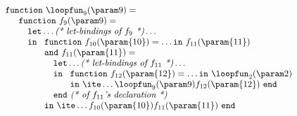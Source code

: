 \begin{equation}
\begin{array}{l}
\begin{array}{l}
\begin{array}[t]{l}
\begin{array}[t]{l}
\begin{array}[t]{l}
\begin{array}[t]{l}
                                  \mathtt{function}\ \loopfun_9 (\param 9) =  \\
                                  \quad \begin{array}[t]{l}
                                       \mathtt{function}\ f_9(\param 9) = \\
                                       \quad \mathtt{let} \ldots \textit{(* let-bindings of $f_9$ *)} \ldots\\
                                       \quad \mathtt{in}\ 
                                             \begin{array}[t]{l}
                                                \mathtt{function}\ f_{10}(\param {10}) = \ldots 
                                                                  \mathtt{in}\ f_{11}(\param{11})\\
                                                \mathtt{and}\ f_{11}(\param {11}) = \\
                                                     \quad \mathtt{let} \ldots \textit{(* let-bindings of $f_{11}$ *)} \ldots\\
                                                     \quad \mathtt{in}\ 
                                                           \begin{array}[t]{l}
                                                              \mathtt{function}\ f_{12}(\param {12}) = 
                                                                                \ldots \mathtt{in}\ \loopfun_2(\param 2)\\
                                                              \mathtt{in}\ \ite \ldots {\loopfun_9(\param 9)} 
                                                                                    {f_{12}(\param{12})}\
                                                              \mathtt{end}
                                                           \end{array}\\
                                                      \quad \mathtt{end}\ \textit{(* of $f_{11}$'s declaration *)}\\
                                                \mathtt{in}\ \ite \ldots {f_{10}(\param {10})}
                                                                         {f_{11}(\param{11})}\ 
                                                             \mathtt{end}
                                             \end{array}\\

\end{array}
\end{array}
\end{array}
\end{array}
\end{array}
\end{array}
\end{array}
\end{equation}
